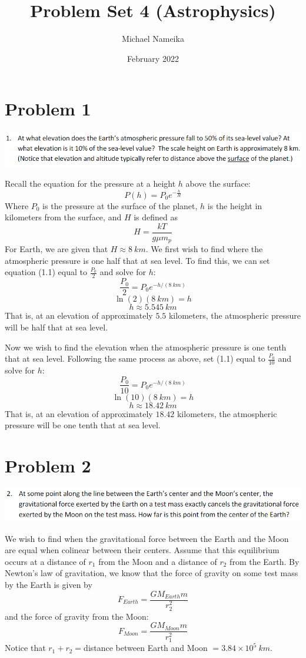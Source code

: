 \documentclass{article}
\title{Problem Set 4 (Astrophysics)}
\author{Michael Nameika}
\date{February 2022}
\begin{document}
\maketitle

\section{Problem 1}
\includegraphics[scale = 0.8]{probset4prob1.PNG}

Recall the equation for the pressure at a height $h$ above the surface:
\begin{equation}
    P(h) = P_0e^{-\frac{h}{H}}
\end{equation}
Where $P_0$ is the pressure at the surface of the planet, $h$ is the height in kilometers from the surface, and $H$ is defined as
\[H = \frac{kT}{g\mu m_p}\]
For Earth, we are given that $H \approx 8  \:km$.
\newline
We first wish to find where the atmospheric pressure is one half that at sea level. To find this, we can set equation (1.1) equal to $\frac{P_0}{2}$ and solve for $h$:
\[\frac{P_0}{2} = P_0 e^{-h/(8 \: km)}\]
\[\ln{(2)} (8 \: km) = h\]
\[h \approx 5.545 \: km\]
That is, at an elevation of approximately $5.5$ kilometers, the atmospheric pressure will be half that at sea level.

Now we wish to find the elevation when the atmospheric pressure is one tenth that at sea level. Following the same process as above, set (1.1) equal to $\frac{P_0}{10}$ and solve for $h$:
\[\frac{P_0}{10} = P_0 e^{-h/(8 \: km)}\]
\[\ln{(10)} (8 \: km) = h\]
\[h \approx 18.42 \: km\]
That is, at an elevation of approximately $18.42$ kilometers, the atmospheric pressure will be one tenth that at sea level.

\section{Problem 2}
\includegraphics[scale = 0.8]{probset4prob2.PNG}

We wish to find when the gravitational force between the Earth and the Moon are equal when colinear between their centers. Assume that this equilibrium occurs at a distance of $r_1$ from the Moon and a distance of $r_2$ from the Earth. By Newton's law of gravitation, we know that the force of gravity on some test mass by the Earth is given by
\[F_{Earth} = \frac{GM_{Earth}m}{r_2^2}\]
and the force of gravity from the Moon:
\[F_{Moon} = \frac{GM_{Moon}m}{r_1^2}\]
Notice that $r_1 + r_2 = $distance between Earth and Moon $ = 3.84 \times 10^5 \: km$.
\end{document}
